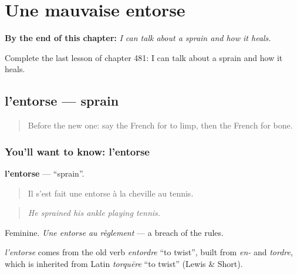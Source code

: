 
\chapter{Une mauvaise entorse}
\label{ch:fr-une-mauvaise-entorse}

\begin{chapteropening}
\textbf{By the end of this chapter:} \emph{I can talk about a sprain and how it heals.}

Complete the last lesson of chapter 481: I can talk about a sprain and how it heals.
\end{chapteropening}

\section[l'entorse]{l'entorse — sprain}

\label{lesson:FR-C481-entorse}



\begin{quote}
Before the new one: say the French for to limp, then the French for bone.
\end{quote}

\subsection*{You'll want to know: l'entorse}
\textbf{l'entorse} — \textquotedblleft{}sprain\textquotedblright{}.

\begin{quote}
Il s'est fait une entorse à la cheville au tennis.
\end{quote}

\begin{quote}
\emph{He sprained his ankle playing tennis.}
\end{quote}

Feminine. \emph{Une entorse au règlement} — a breach of the rules.

\begin{cousinweb}
\emph{l'entorse} comes from the old verb \emph{entordre} \textquotedblleft{}to twist\textquotedblright{}, built from \emph{en-} and \emph{tordre}, which is inherited from Latin \emph{torquēre} \textquotedblleft{}to twist\textquotedblright{} (Lewis \& Short).
\end{cousinweb}


